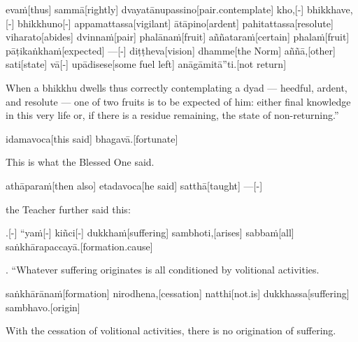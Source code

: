 \begin{samepage}
\begingl[glneveryline={\PaliGlossA,\PaliGlossB}]
evaṁ[thus] sammā[rightly] dvayatānupassino[pair.contemplate] kho,[-] bhikkhave,[-] bhikkhuno[-] appamattassa[vigilant] ātāpino[ardent] pahitattassa[resolute] viharato[abides] dvinnaṁ[pair] phalānaṁ[fruit] aññataraṁ[certain] phalaṁ[fruit] pāṭikaṅkhaṁ[expected] —[-] diṭṭheva[vision] dhamme[the Norm] aññā,[other] sati[state] vā[-] upādisese[some fuel left] anāgāmitā”ti.[not return]
\endgl
\nopagebreak
\linespread{0.5}
\begin{spacin}{0.2}
{\PaliGlossFT When a bhikkhu dwells thus correctly contemplating a dyad — heedful, ardent, and resolute — one of two fruits is to be expected of him: either final knowledge in this very life or, if there is a residue remaining, the state of non-returning.”}
\end{spacin}
\vskip 12pt
\end{samepage}
\begin{samepage}
\begingl[glneveryline={\PaliGlossA,\PaliGlossB}]
idamavoca[this said] bhagavā.[fortunate]
\endgl
\nopagebreak
\linespread{0.5}
\begin{spacin}{0.2}
{\PaliGlossFT This is what the Blessed One said.}
\end{spacin}
\vskip 12pt
\end{samepage}
\begin{samepage}
\begingl[glneveryline={\PaliGlossA,\PaliGlossB}]
athāparaṁ[then also] etadavoca[he said] satthā[taught] —[-]
\endgl
\nopagebreak
\linespread{0.5}
\begin{spacin}{0.2}
{\PaliGlossFT the Teacher further said this:}
\end{spacin}
\vskip 12pt
\end{samepage}
\vskip 0.2in
\begin{samepage}
.[-] “yaṁ[-] kiñci[-] dukkhaṁ[suffering] sambhoti,[arises] sabbaṁ[all] saṅkhārapaccayā.[formation.cause]
\endgl
\nopagebreak
\linespread{0.5}
\begin{spacin}{0.2}
{. “Whatever suffering originates  is all conditioned by volitional activities.}
\end{spacin}
\vskip 12pt
\end{samepage}
\begin{samepage}
\begingl[glneveryline={\PaliGlossA,\PaliGlossB}]
saṅkhārānaṁ[formation] nirodhena,[cessation] natthi[not.is] dukkhassa[suffering] sambhavo.[origin]
\endgl
\nopagebreak
\linespread{0.5}
\begin{spacin}{0.2}
{\PaliGlossFT With the cessation of volitional activities, there is no origination of suffering.}
\end{spacin}
\vskip 12pt
\end{samepage}
